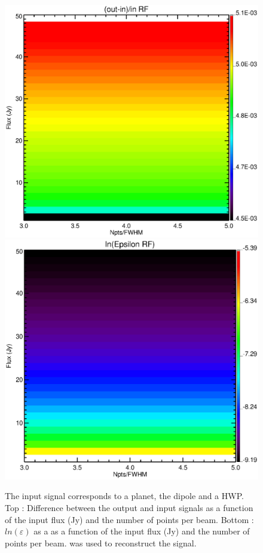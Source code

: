 \begin{figure}[h]
\center
	\includegraphics[scale=0.2]{Figures/diff_rf_planet_hwp_dipole.eps}
	\includegraphics[scale=0.2]{Figures/epsilon_rf_planet_hwp_dipole.eps}
	\caption{The input signal corresponds to a planet, the dipole and a HWP. Top : Difference between the output and input signals as a function of the input flux (Jy) and the number of points per beam. Bottom : $ln(\varepsilon)$ as a as a function of the input flux (Jy) and the number of points per beam. \rf was used to reconstruct the signal.}
	\label{fig:epsilon-rf-planet-hwp-dipole}
\end{figure}

